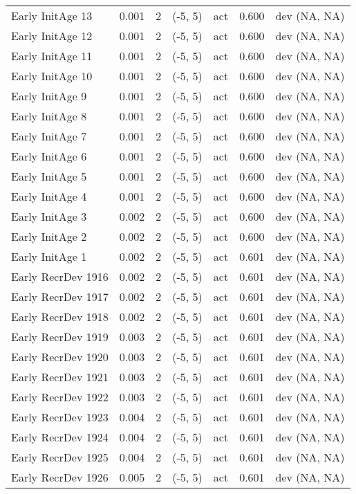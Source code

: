 \documentclass[11pt,
  english,
  letterpaper,
]{article}
\begin{document}
\begin{landscape}
\begin{longtable}[t]{>{\raggedright\arraybackslash}p{7.5cm}lllll>{\raggedright\arraybackslash}p{3.5cm}}
Early InitAge 13 & 0.001 & 2 & (-5, 5) & act & 0.600 & dev (NA, NA)\\
Early InitAge 12 & 0.001 & 2 & (-5, 5) & act & 0.600 & dev (NA, NA)\\
Early InitAge 11 & 0.001 & 2 & (-5, 5) & act & 0.600 & dev (NA, NA)\\
Early InitAge 10 & 0.001 & 2 & (-5, 5) & act & 0.600 & dev (NA, NA)\\
Early InitAge 9 & 0.001 & 2 & (-5, 5) & act & 0.600 & dev (NA, NA)\\
Early InitAge 8 & 0.001 & 2 & (-5, 5) & act & 0.600 & dev (NA, NA)\\
Early InitAge 7 & 0.001 & 2 & (-5, 5) & act & 0.600 & dev (NA, NA)\\
Early InitAge 6 & 0.001 & 2 & (-5, 5) & act & 0.600 & dev (NA, NA)\\
Early InitAge 5 & 0.001 & 2 & (-5, 5) & act & 0.600 & dev (NA, NA)\\
Early InitAge 4 & 0.001 & 2 & (-5, 5) & act & 0.600 & dev (NA, NA)\\
Early InitAge 3 & 0.002 & 2 & (-5, 5) & act & 0.600 & dev (NA, NA)\\
Early InitAge 2 & 0.002 & 2 & (-5, 5) & act & 0.600 & dev (NA, NA)\\
Early InitAge 1 & 0.002 & 2 & (-5, 5) & act & 0.601 & dev (NA, NA)\\
Early RecrDev 1916 & 0.002 & 2 & (-5, 5) & act & 0.601 & dev (NA, NA)\\
Early RecrDev 1917 & 0.002 & 2 & (-5, 5) & act & 0.601 & dev (NA, NA)\\
Early RecrDev 1918 & 0.002 & 2 & (-5, 5) & act & 0.601 & dev (NA, NA)\\
Early RecrDev 1919 & 0.003 & 2 & (-5, 5) & act & 0.601 & dev (NA, NA)\\
Early RecrDev 1920 & 0.003 & 2 & (-5, 5) & act & 0.601 & dev (NA, NA)\\
Early RecrDev 1921 & 0.003 & 2 & (-5, 5) & act & 0.601 & dev (NA, NA)\\
Early RecrDev 1922 & 0.003 & 2 & (-5, 5) & act & 0.601 & dev (NA, NA)\\
Early RecrDev 1923 & 0.004 & 2 & (-5, 5) & act & 0.601 & dev (NA, NA)\\
Early RecrDev 1924 & 0.004 & 2 & (-5, 5) & act & 0.601 & dev (NA, NA)\\
Early RecrDev 1925 & 0.004 & 2 & (-5, 5) & act & 0.601 & dev (NA, NA)\\
Early RecrDev 1926 & 0.005 & 2 & (-5, 5) & act & 0.601 & dev (NA, NA)\\

\end{longtable}
\end{landscape}
\end{document}
